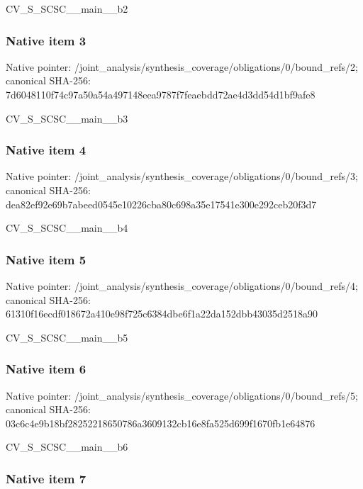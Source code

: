 \documentclass[10pt,a4paper]{article}
\begin{document}
CV\_S\_SCSC\_\_main\_\_b2


\subsubsection{Native item 3}


Native pointer: /joint\_analysis/synthesi\allowbreak{}s\_coverage/obligations/0\allowbreak{}/bound\_refs/2; canonical SHA-256: 7d6048110f74c97a50a54a49\allowbreak{}7148eea9787f7feaebdd72ae\allowbreak{}4d3dd54d1bf9afe8


CV\_S\_SCSC\_\_main\_\_b3


\subsubsection{Native item 4}


Native pointer: /joint\_analysis/synthesi\allowbreak{}s\_coverage/obligations/0\allowbreak{}/bound\_refs/3; canonical SHA-256: dea82ef92e69b7abeed0545e\allowbreak{}10226cba80c698a35e17541e\allowbreak{}300e292ceb20f3d7


CV\_S\_SCSC\_\_main\_\_b4


\subsubsection{Native item 5}


Native pointer: /joint\_analysis/synthesi\allowbreak{}s\_coverage/obligations/0\allowbreak{}/bound\_refs/4; canonical SHA-256: 61310f16ecdf018672a410e9\allowbreak{}8f725c6384dbe6f1a22da152\allowbreak{}dbb43035d2518a90


CV\_S\_SCSC\_\_main\_\_b5


\subsubsection{Native item 6}


Native pointer: /joint\_analysis/synthesi\allowbreak{}s\_coverage/obligations/0\allowbreak{}/bound\_refs/5; canonical SHA-256: 03c6c4e9b18bf28252218650\allowbreak{}786a3609132cb16e8fa525d6\allowbreak{}99f1670fb1e64876


CV\_S\_SCSC\_\_main\_\_b6


\subsubsection{Native item 7}
\end{document}
